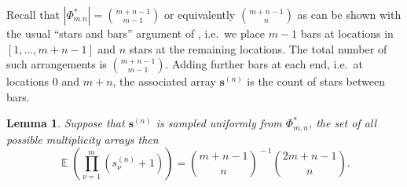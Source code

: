 \documentclass[a4paper,11pt]{article}
\newtheorem{lemma}{Lemma}%
\newcommand{\EX}{\mathop{{}\mathbb{E}}}
\begin{document}
Recall that $|\Phi_{m.n}^*| = \binom{m+n-1}{m-1}$ or equivalently $\binom{m+n-1}{n}$ as can be shown with the usual ``stars and bars'' argument of \citet{Feller:1968}, i.e.\ we place $m-1$ bars at locations in $[1,\dots,m+n-1]$ and $n$ stars at the remaining locations.  The total number of such arrangements is $\binom{m+n-1}{m-1}$. Adding further bars at each end, i.e.\ at locations $0$ and $m+n$, the associated array $\mathbf{s}^{(n)}$ is the count of stars between bars.

\vspace{0.5em}
\begin{lemma}\label{lm:multiplicity} Suppose that $\mathbf{s}^{(n)}$ is sampled uniformly from $\Phi_{m,n}^*$, the set of all possible multiplicity arrays then 
\begin{equation}\label{eq:multiplicity} \EX \left(\prod_{\nu=1}^m(s_\nu^{(n)} + 1)\right) =  \binom{ m+ n-1}{n}^{\!-1} \binom{2 m + n -1}{n}.
\end{equation}
\end{lemma}
\end{document}

